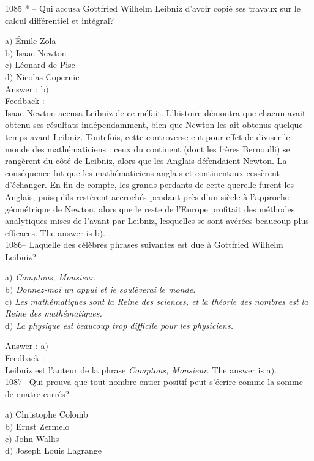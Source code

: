﻿\documentclass[letterpaper, 12pt]{article}
\begin{document}
1085 * -- Qui accusa Gottfried Wilhelm Leibniz d'avoir copi\'e ses
travaux sur le calcul diff\'erentiel et int\'egral?

a$)$ \'Emile Zola \\
b$)$ Isaac Newton \\
c$)$ L\'eonard de Pise \\
d$)$ Nicolas Copernic  \\

Answer : b$)$\\

Feedback : \\
Isaac Newton accusa Leibniz de ce m\'efait. L'histoire d\'emontra
que chacun avait obtenu ses r\'esultats ind\'ependam\-ment, bien que
Newton les ait obtenus quelque temps avant Leibniz. Toutefois, cette
controverse eut pour effet de diviser le monde des math\'ematiciens
: ceux du continent (dont les fr\`eres Bernoulli) se rang\`erent du
c\^ot\'e de Leibniz, alors que les Anglais d\'efendaient Newton. La
cons\'equence fut que les math\'ematiciens anglais et continentaux
cess\`erent d'\'echanger. En fin de compte, les grands perdants de
cette querelle furent les Anglais, puisqu'ils rest\`erent
accroch\'es pendant pr\`es d'un si\`ecle \`a l'approche
g\'eom\'etrique de Newton, alors que le reste de l'Europe profitait
des m\'ethodes analytiques mises de l'avant par Leibniz, lesquelles
se sont av\'er\'ees beaucoup plus efficaces.
The answer is b$)$.\\

1086-- Laquelle des c\'el\`ebres phrases suivantes est due \`a
Gottfried Wilhelm Leibniz?

a$)$ {\sl Comptons, Monsieur}. \\
b$)$ {\sl Donnez-moi un appui et je soul\`everai le monde.} \\
c$)$ {\sl Les math\'ematiques sont la Reine des sciences, et la th\'eorie
des nombres est la Reine des math\'ematiques.} \\
d$)$ {\sl La physique est beaucoup trop difficile pour les physiciens.}

Answer : a$)$\\

Feedback : \\
Leibniz est l'auteur de la phrase {\sl Comptons, Monsieur}.
The answer is a$)$.\\

1087-- Qui prouva que tout nombre entier positif peut s'\'ecrire
comme la somme de quatre carr\'es?

a$)$ Christophe Colomb \\
b$)$ Ernst Zermelo \\
c$)$ John Wallis \\
d$)$ Joseph Louis Lagrange\\
\end{document}

